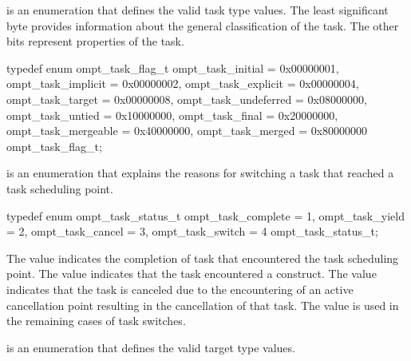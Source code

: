 
\label{sec:ompt_task_flag_t}
 is an enumeration that defines the valid task type values.
The least significant byte provides information about the general classification of the task.
The other bits represent properties of the task.

\begin{ccppspecific}
\begin{omptEnum}
typedef enum ompt_task_flag_t {
  ompt_task_initial                   = 0x00000001,
  ompt_task_implicit                  = 0x00000002,
  ompt_task_explicit                  = 0x00000004,
  ompt_task_target                    = 0x00000008,
  ompt_task_undeferred                = 0x08000000,
  ompt_task_untied                    = 0x10000000,
  ompt_task_final                     = 0x20000000,
  ompt_task_mergeable                 = 0x40000000,
  ompt_task_merged                    = 0x80000000
} ompt_task_flag_t;
\end{omptEnum}
\end{ccppspecific}





\label{sec:ompt_task_status_t}
 is an enumeration that explains the
reasons for switching a task that reached  a task scheduling point.


\begin{ccppspecific}
\begin{omptEnum}
typedef enum ompt_task_status_t {
  ompt_task_complete  = 1,
  ompt_task_yield     = 2,
  ompt_task_cancel    = 3,
  ompt_task_switch    = 4
} ompt_task_status_t;
\end{omptEnum}
\end{ccppspecific}


The value  indicates the completion of task that
encountered the task scheduling point. The value  indicates
that the task encountered a  construct. The value  indicates
that the task is canceled due to the encountering of an active cancellation point resulting in the
cancellation of that task.
The value  is used in the remaining cases of task switches.


\label{sec:ompt_target_t}
 is an enumeration that defines the valid target type values.


